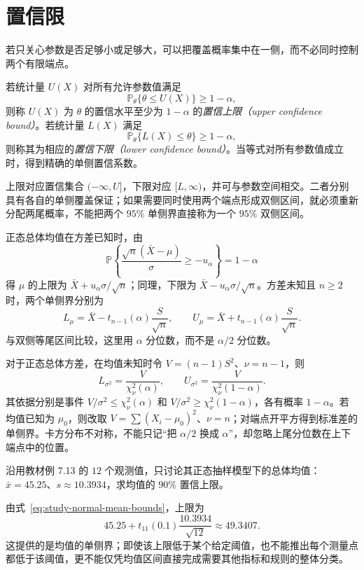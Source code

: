 \section{置信限}
\label{sec:study-confidence-bounds}

若只关心参数是否足够小或足够大，可以把覆盖概率集中在一侧，而不必同时控制两个有限端点。

\begin{definition}
\label{def:study-confidence-bounds}
若统计量 $U(X)$ 对所有允许参数值满足
\[
  \mathbb P_\theta\{\theta\le U(X)\}\ge1-\alpha,
\]
则称 $U(X)$ 为 $\theta$ 的置信水平至少为 $1-\alpha$ 的\emph{置信上限（upper confidence bound）}。若统计量 $L(X)$ 满足
\[
  \mathbb P_\theta\{L(X)\le\theta\}\ge1-\alpha,
\]
则称其为相应的\emph{置信下限（lower confidence bound）}。当等式对所有参数值成立时，得到精确的单侧置信系数。
\end{definition}

上限对应置信集合 $(-\infty,U]$，下限对应 $[L,\infty)$，并可与参数空间相交。二者分别具有各自的单侧覆盖保证；如果需要同时使用两个端点形成双侧区间，就必须重新分配两尾概率，不能把两个 $95\%$ 单侧界直接称为一个 $95\%$ 双侧区间。

正态总体均值在方差已知时，由
\[
  \mathbb P\left\{\frac{\sqrt n(\bar X-\mu)}\sigma\ge-u_\alpha\right\}
  =1-\alpha
\]
得 $\mu$ 的上限为 $\bar X+u_\alpha\sigma/\sqrt n$；同理，下限为 $\bar X-u_\alpha\sigma/\sqrt n$。方差未知且 $n\ge2$ 时，两个单侧界分别为
\begin{equation}
  L_\mu=\bar X-t_{n-1}(\alpha)\frac S{\sqrt n},\qquad
  U_\mu=\bar X+t_{n-1}(\alpha)\frac S{\sqrt n}.
  \label{eq:study-normal-mean-bounds}
\end{equation}
与双侧等尾区间比较，这里用 $\alpha$ 分位数，而不是 $\alpha/2$ 分位数。

对于正态总体方差，在均值未知时令 $V=(n-1)S^2$、$\nu=n-1$，则
\begin{equation}
  L_{\sigma^2}=\frac V{\chi_\nu^2(\alpha)},\qquad
  U_{\sigma^2}=\frac V{\chi_\nu^2(1-\alpha)}.
  \label{eq:study-normal-variance-bounds}
\end{equation}
其依据分别是事件 $V/\sigma^2\le\chi_\nu^2(\alpha)$ 和 $V/\sigma^2\ge\chi_\nu^2(1-\alpha)$，各有概率 $1-\alpha$。若均值已知为 $\mu_0$，则改取 $V=\sum(X_i-\mu_0)^2$、$\nu=n$；对端点开平方得到标准差的单侧界。卡方分布不对称，不能只记“把 $\alpha/2$ 换成 $\alpha$”，却忽略上尾分位数在上下端点中的位置。

\begin{example}
\label{ex:study-one-sided-normal-mean}
沿用教材例 7.13 的 $12$ 个观测值，只讨论其正态抽样模型下的总体均值：$\bar x=45.25$、$s\approx10.3934$，求均值的 $90\%$ 置信上限。
\end{example}
\begin{solve}
由式~\eqref{eq:study-normal-mean-bounds}，上限为
\[
  45.25+t_{11}(0.1)\frac{10.3934}{\sqrt{12}}
  \approx49.3407.
\]
这提供的是均值的单侧界；即使该上限低于某个给定阈值，也不能推出每个测量点都低于该阈值，更不能仅凭均值区间直接完成需要其他指标和规则的整体分类。
\end{solve}

